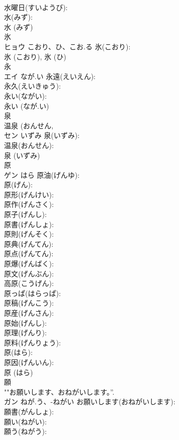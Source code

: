 \documentclass[8pt]{extreport}
\begin{document}
\begin{CJK}{UTF8}{min}
\\	水曜日(すいようび): 
\\	水(みず): 
\\	水 (みず)
\\	氷			
\\	ヒョウ	こおり、ひ、こお.る	氷(こおり): 
\\	氷 (こおり), 氷 (ひ)
\\	永			
\\	エイ	なが.い	永遠(えいえん): 
\\	永久(えいきゅう): 
\\	永い(ながい): 
\\	永い (なが.い)
\\	泉			
\\	温泉 (おんせん, 
\\	セン	いずみ	泉(いずみ): 
\\	温泉(おんせん): 
\\	泉 (いずみ)
\\	原			
\\	ゲン	はら	原油(げんゆ): 
\\	原(げん): 
\\	原形(げんけい): 
\\	原作(げんさく): 
\\	原子(げんし): 
\\	原書(げんしょ): 
\\	原則(げんそく): 
\\	原典(げんてん): 
\\	原点(げんてん): 
\\	原爆(げんばく): 
\\	原文(げんぶん): 
\\	高原(こうげん): 
\\	原っぱ(はらっぱ): 
\\	原稿(げんこう): 
\\	原産(げんさん): 
\\	原始(げんし): 
\\	原理(げんり): 
\\	原料(げんりょう): 
\\	原(はら): 
\\	原因(げんいん): 
\\	原 (はら)
\\	願			
\\	""お願いします、おねがいします。”.
\\	ガン	ねが.う、-ねがい	お願いします(おねがいします): 
\\	願書(がんしょ): 
\\	願い(ねがい): 
\\	願う(ねがう): 

\end{CJK}
\end{document}
